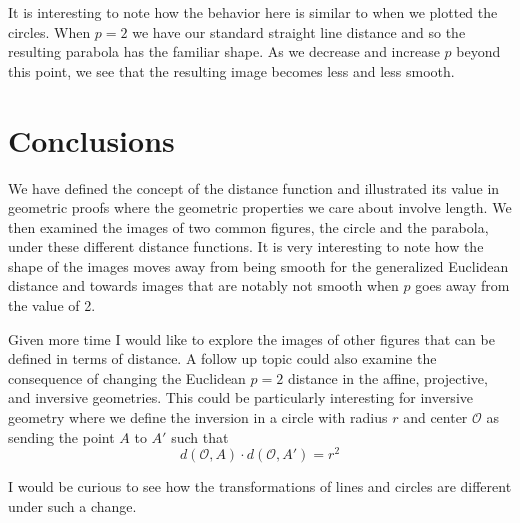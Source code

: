 \documentclass[a4paper, 12pt]{article}
\begin{document}
It is interesting to note how the behavior here is similar to when we plotted the circles. When $p=2$ we have our standard straight line distance and so the resulting parabola has the familiar shape. As we decrease and increase $p$ beyond this point, we see that the resulting image becomes less and less smooth.

\section*{Conclusions}
We have defined the concept of the distance function and illustrated its value in geometric proofs where the geometric properties we care about involve length. We then examined the images of two common figures, the circle and the parabola, under these different distance functions. It is very interesting to note how the shape of the images moves away from being smooth for the generalized Euclidean distance and towards images that are notably not smooth when $p$ goes away from the value of 2.

Given more time I would like to explore the images of other figures that can be defined in terms of distance. A follow up topic could also examine the consequence of changing the Euclidean $p=2$ distance in the affine, projective, and inversive geometries. This could be particularly interesting for inversive geometry where we define the inversion in a circle with radius $r$ and center $\mathcal{O}$ as sending the point $A$ to $A'$ such that
\begin{equation*}
    d(\mathcal{O}, A)\cdot d(\mathcal{O}, A') = r^2
\end{equation*}

\noindent I would be curious to see how the transformations of lines and circles are different under such a change.






\end{document}
